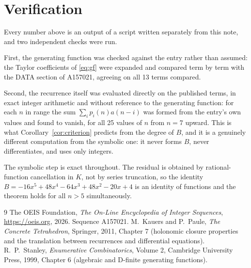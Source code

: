 \documentclass[11pt,a4paper]{article}
\theoremstyle{plain}
\theoremstyle{definition}
\begin{document}
\section{Verification}

Every number above is an output of a script written separately from this note, and two
independent checks were run.

First, the generating function was checked against the entry rather than assumed: the
Taylor coefficients of \eqref{eq:gf} were expanded and compared term by term with the DATA
section of A157021, agreeing on all 13 terms compared.

Second, the recurrence itself was evaluated directly on the published terms, in exact
integer arithmetic and without reference to the generating function: for each $n$ in range
the sum $\sum_{i}p_{i}(n)a(n-i)$ was formed from the entry's own values and found to
vanish, for all 25 values of $n$ from $n=7$ upward. This is what
Corollary~\ref{cor:criterion} predicts from the degree of $B$, and it is a genuinely
different computation from the symbolic one: it never forms $B$, never differentiates, and
uses only integers.

The symbolic step is exact throughout. The residual is obtained by rational-function
cancellation in $K$, not by series truncation, so the identity $B=- 16 x^{5} + 48 x^{4} - 64 x^{3} + 48 x^{2} - 20 x + 4$ is an
identity of functions and the theorem holds for all $n>5$ simultaneously.

\begin{thebibliography}{9}
 The OEIS Foundation, \emph{The On-Line Encyclopedia of Integer Sequences},
\url{https://oeis.org}, 2026. Sequence A157021.
 M.~Kauers and P.~Paule, \emph{The Concrete Tetrahedron}, Springer, 2011,
Chapter 7 (holonomic closure properties and the translation between recurrences and
differential equations).
 R.~P.~Stanley, \emph{Enumerative Combinatorics}, Volume 2, Cambridge
University Press, 1999, Chapter 6 (algebraic and D-finite generating functions).
\end{thebibliography}
\end{document}

